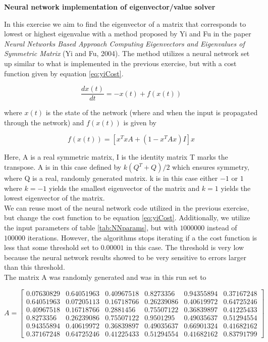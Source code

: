 \documentclass[12pt,a4paper]{article}
\begin{document}
\begin{center}
\large{\textbf{Neural network implementation of eigenvector/value solver}}
\end{center}

\noindent In this exercise we aim to find the eigenvector of a matrix that corresponds to lowest or highest eigenvalue with a method proposed by Yi and Fu in the paper \emph{Neural Networks Based Approach Computing Eigenvectors and Eigenvalues of Symmetric Matrix} (Yi and Fu, 2004). The method utilizes a neural network set up similar to what is implemented in the previous exercise, but with a cost function given by equation \ref{eq:yiCost}.

\begin{equation}\label{eq:yiCost}
\frac{d x(t)}{dt} = -x(t) + f(x(t))
\end{equation}

\noindent where $x(t)$ is the state of the network (where and when the input is propagated through the network) and $f(x(t))$ is given by 

\begin{equation}\label{eq:fxt}
f(x(t)) = [x^TxA + (1-x^TAx)I]x
\end{equation}

\noindent Here, A is a real symmetric matrix, I is the identity matrix T marks the transpose. A is in this case defined by $k(Q^T + Q)/2$ which ensures symmetry, where Q is a real, randomly generated matrix. k is in this case either $-1$ or $1$ where $k = -1$ yields the smallest eigenvector of the matrix and $k = 1$ yields the lowest eigenvector of the matrix. 
\\
We can reuse most of the neural network code utilized in the previous exercise, but change the cost function to be equation \ref{eq:yiCost}. Additionally, we utilize the input parameters of table \ref{tab:NNparams}, but with $1000000$ instead of $100000$ iterations. However, the algorithms stops iterating if a the cost function is less that some threshold set to $0.00001$ in this case. The threshold is very low because the neural network results showed to be very sensitive to errors larger than this threshold.
\\
The matrix A was randomly generated and was in this run set to

\[
A=
  \begin{bmatrix}
    0.07630829 & 0.64051963 & 0.40967518 & 0.8273356 & 0.94355894 & 0.37167248 \\
    0.64051963 & 0.07205113 & 0.16718766 & 0.26239086 & 0.40619972 & 0.64725246 \\
    0.40967518 & 0.16718766 & 0.2881456 & 0.75507122 & 0.36839897 & 0.41225433 \\
    0.8273356 & 0.26239086 & 0.75507122 & 0.9501295 & 0.49035637 & 0.51294554 \\
    0.94355894 & 0.40619972 & 0.36839897 & 0.49035637 & 0.66901324 & 0.41682162 \\
    0.37167248 & 0.64725246 & 0.41225433 & 0.51294554 & 0.41682162 & 0.83791799 
  \end{bmatrix}
\]
\end{document}
